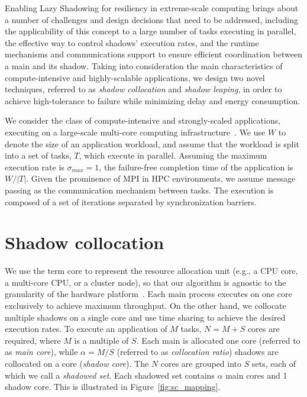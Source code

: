 Enabling Lazy Shadowing for resiliency in extreme-scale computing 
brings about a number of challenges and design decisions that need to be addressed, including the applicability of this concept to a large number of 
tasks executing in parallel, the effective way to control shadows' execution rates, and the runtime mechanisms and 
communications support to ensure efficient coordination between a 
main and its shadow.
Taking into consideration the main characteristics of compute-intensive and highly-scalable applications, we design two novel techniques, referred to as {\it shadow collocation} and {\it shadow leaping}, in order to achieve high-tolerance to failure while minimizing delay and energy consumption.

We consider the class of compute-intensive and strongly-scaled applications, executing on a large-scale multi-core computing infrastructure~\cite{doe_ascr_exascale_2011}. 
We use $W$ to denote the size of an application workload, and assume that the workload is split into a set of tasks, $T$, which execute in parallel. 
Assuming the maximum execution rate is $\sigma_{max}=1$, the failure-free completion time of the application is $W/|T|$. 
Given the prominence of MPI in HPC environments, we assume message passing as the communication mechanism between tasks. 
The execution is composed of a set of iterations separated by synchronization barriers. 

\section{Shadow collocation}

We use the term core to represent the resource allocation unit (e.g., a
CPU core, a multi-core CPU, or a cluster node), so that our algorithm is agnostic to the
granularity of the hardware platform~\cite{casanova_inria_2012}. Each main process executes on one core exclusively to achieve maximum throughput.  
On the other hand, we collocate multiple shadows on a single core and use time sharing to achieve the desired execution rates.
To execute an application of $M$ tasks, $N=M+S$ cores are required, where $M$ is a multiple of $S$. Each main is allocated one core (referred to as \textit{main core}), while $\alpha=M/S$ (referred to as \textit{collocation ratio}) shadows are collocated on a core (\textit{shadow core}). 
The $N$ cores are grouped into $S$ sets, each of which we call a \textit{shadowed set}. Each shadowed set contains $\alpha$ main cores and 1 shadow core.
This is illustrated in Figure~\ref{fig:sc_mapping}.  

